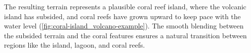 The resulting terrain represents a plausible coral reef island, where the volcanic island has subsided, and coral reefs have grown upward to keep pace with the water level (\cref{fig:coral-island_volcano-example}). The smooth blending between the subsided terrain and the coral features ensures a natural transition between regions like the island, lagoon, and coral reefs.